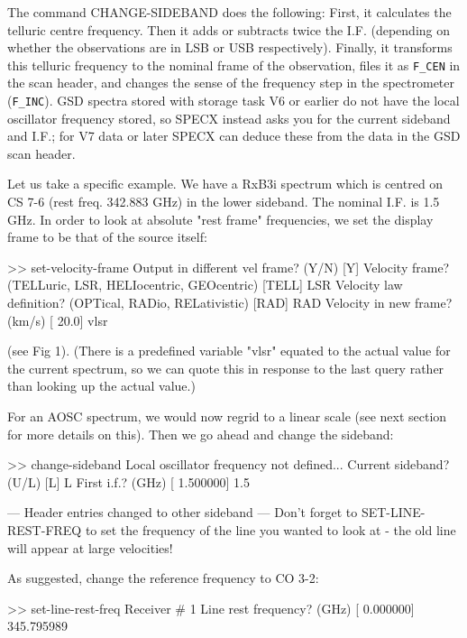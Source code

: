 \documentclass[twoside,11pt,nolof]{starlink}
\begin{document}
The command CHANGE-SIDEBAND does the following: First, it calculates the
telluric centre frequency. Then it adds or subtracts twice the I.F. (depending
on whether the observations are in LSB or USB respectively). Finally, it
transforms this telluric frequency to the nominal frame of the observation,
files it as \texttt{F\_CEN} in the scan header, and changes the sense of the
frequency step in the spectrometer (\texttt{F\_INC}). GSD spectra stored with
storage task V6 or earlier do not have the local oscillator frequency stored,
so SPECX instead asks you for the current sideband and I.F.; for V7 data or
later SPECX can deduce these from the data in the GSD scan header.

Let us take a specific example. We have a RxB3i spectrum which is centred on CS
7-6 (rest freq. 342.883 GHz) in the lower sideband.  The nominal I.F. is 1.5
GHz. In order to look at absolute "rest frame" frequencies, we set the display
frame to be that of the source itself:

\begin{terminalv}
>> set-velocity-frame
Output in different vel frame? (Y/N) [Y]
Velocity frame? (TELLuric, LSR, HELIocentric, GEOcentric) [TELL] LSR
Velocity law definition? (OPTical, RADio, RELativistic) [RAD] RAD
Velocity in new frame? (km/s) [  20.0] vlsr
\end{terminalv}
(see Fig 1). (There is a predefined variable "vlsr" equated to the actual value
for the current spectrum, so we can quote this in response to the last query
rather than looking up the actual value.)

For an AOSC spectrum, we would now regrid to a linear scale (see next section
for more details on this). Then we go ahead and change the sideband:
\begin{terminalv}
>> change-sideband
Local oscillator frequency not defined...
Current sideband? (U/L) [L] L
First i.f.? (GHz) [ 1.500000] 1.5

 --- Header entries changed to other sideband ---
   Don't forget to SET-LINE-REST-FREQ to set the
   frequency of the line you wanted to look at -
   the old line will appear at large velocities!
\end{terminalv}

As suggested, change the reference frequency to CO 3-2:
\begin{terminalv}
>> set-line-rest-freq
Receiver # 1  Line rest frequency? (GHz) [  0.000000] 345.795989
\end{terminalv}

\end{document}
